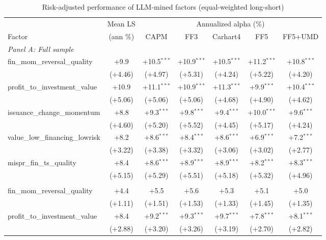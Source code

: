 \begin{table}[htbp]\centering
\caption{Risk-adjusted performance of LLM-mined factors (equal-weighted long-short)}
\label{tab:alphas_ew}
\begin{threeparttable}\footnotesize
\begin{tabular}{lcccccc}
\toprule
 & Mean LS & \multicolumn{5}{c}{Annualized alpha (\%)} \\
\cmidrule(lr){3-7}
Factor & (ann \%) & CAPM & FF3 & Carhart4 & FF5 & FF5+UMD \\
\midrule
\multicolumn{7}{l}{\textit{Panel A: Full sample}} \\
\addlinespace
fin\_mom\_reversal\_quality & +9.9 & +10.5$^{***}$ & +10.9$^{***}$ & +10.5$^{***}$ & +11.2$^{***}$ & +10.8$^{***}$ \\
 & (+4.46) & (+4.97) & (+5.31) & (+4.24) & (+5.22) & (+4.20) \\
\addlinespace
profit\_to\_investment\_value & +10.9 & +11.1$^{***}$ & +10.9$^{***}$ & +11.3$^{***}$ & +9.9$^{***}$ & +10.4$^{***}$ \\
 & (+5.06) & (+5.06) & (+5.06) & (+4.68) & (+4.90) & (+4.62) \\
\addlinespace
issuance\_change\_momentum & +8.8 & +9.3$^{***}$ & +9.8$^{***}$ & +9.4$^{***}$ & +10.0$^{***}$ & +9.6$^{***}$ \\
 & (+4.60) & (+5.20) & (+5.52) & (+4.45) & (+5.17) & (+4.24) \\
\addlinespace
value\_low\_financing\_lowrisk & +8.2 & +8.6$^{***}$ & +8.4$^{***}$ & +8.6$^{***}$ & +6.9$^{***}$ & +7.2$^{***}$ \\
 & (+3.22) & (+3.38) & (+3.32) & (+3.06) & (+3.02) & (+2.77) \\
\addlinespace
mispr\_fin\_ts\_quality & +8.4 & +8.6$^{***}$ & +8.9$^{***}$ & +8.9$^{***}$ & +8.2$^{***}$ & +8.3$^{***}$ \\
 & (+5.15) & (+5.29) & (+5.51) & (+5.18) & (+5.32) & (+4.96) \\
\addlinespace
\midrule
\multicolumn{7}{l}{\textit{Panel B: Out-of-sample (post-2000-12-31)}} \\
\addlinespace
fin\_mom\_reversal\_quality & +4.4 & +5.5 & +5.6 & +5.3 & +5.1 & +5.0 \\
 & (+1.11) & (+1.51) & (+1.53) & (+1.33) & (+1.45) & (+1.35) \\
\addlinespace
profit\_to\_investment\_value & +8.4 & +9.2$^{***}$ & +9.3$^{***}$ & +9.7$^{***}$ & +7.8$^{***}$ & +8.1$^{***}$ \\
 & (+2.88) & (+3.20) & (+3.26) & (+3.19) & (+2.70) & (+2.82) \\

\end{tabular}
\end{threeparttable}
\end{table}
